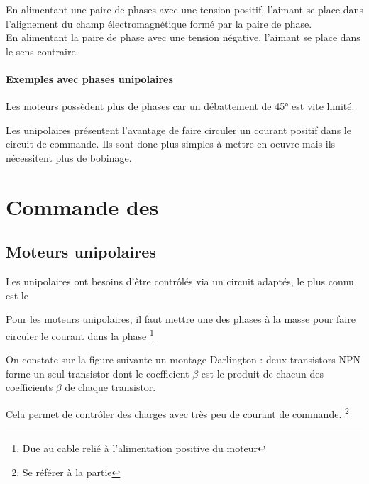 En alimentant une paire de phases avec une tension positif, l'aimant se place dans l'alignement du champ électromagnétique 
formé par la paire de phase.\\
En alimentant la paire de phase avec une tension négative, l'aimant se place dans le sens contraire.\\



\subsubsection{Exemples avec phases unipolaires}


Les moteurs possèdent plus de phases car un débattement de 45° est vite limité.

Les \pap unipolaires présentent l'avantage de faire circuler un courant positif dans le circuit de commande. 
Ils sont donc plus simples à mettre en oeuvre mais ils nécessitent plus de bobinage.

\chapter{Commande des \paps}

\section{Moteurs unipolaires}
Les \pap unipolaires ont besoins d'être contrôlés via un circuit adaptés, le plus connu est le 



Pour les moteurs unipolaires, il faut mettre une des phases à la masse pour faire circuler le courant dans la phase \footnote{Due au cable relié à l'alimentation positive du moteur}

On constate sur la figure suivante un montage Darlington : deux transistors NPN forme un seul transistor dont le coefficient
$\beta$ est le produit de chacun des coefficients $\beta$ de chaque transistor.

Cela permet de contrôler des charges avec très peu de courant de commande. \footnote{Se référer à la partie }

